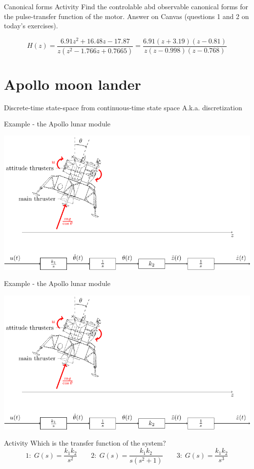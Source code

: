 \documentclass[presentation,aspectratio=1610]{beamer}
\begin{document}
\begin{frame}[label={sec:orgcb7a0f5}]{Canonical forms}
\alert{Activity} Find the controlable abd observable canonical forms for the pulse-transfer function of the motor. Answer on Canvas (questions 1 and 2 on today's exercises).

\[ H(z) = \frac{6.91z^2 + 16.48z -17.87}{z(z^2 - 1.766z + 0.7665)} = \frac{6.91(z+3.19)(z-0.81)}{z(z-0.998)(z-0.768)}\]
\end{frame}

\section{Apollo moon lander}
\label{sec:org0898f55}
\begin{frame}[label={sec:org0461feb}]{Discrete-time state-space  from continuous-time state space}
A.k.a. discretization
\end{frame}

\begin{frame}[label={sec:orgb2a2f80}]{Example - the Apollo lunar module}
\begin{center}
\includegraphics[width=\linewidth]{fig-apollo}
\end{center}
\end{frame}
\begin{frame}[label={sec:orgacd27c5}]{Example - the Apollo lunar module}
\begin{center}
\includegraphics[width=0.8\linewidth]{fig-apollo}
\end{center}
\alert{Activity} Which is the transfer function of the system?
\[1: \; G(s) = \frac{k_1 k_2}{s^2}\qquad 2: \; G(s) = \frac{k_1 k_2}{s(s^2 + 1)} \qquad 3: \; G(s) = \frac{k_1 k_2}{s^3}\]
\end{frame}
\end{document}
